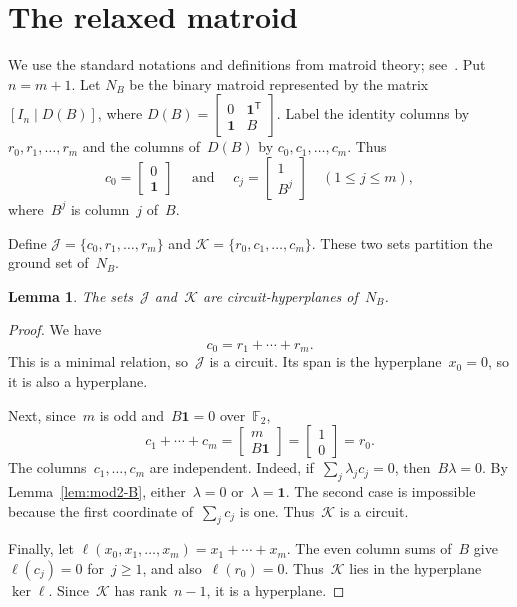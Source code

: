 \documentclass{amsart}
\newtheorem{lemma}[theorem]{Lemma}
\numberwithin{equation}{section}
\newcommand{\F}{\mathbb F}
\newcommand{\one}{\mathbf 1}
\newcommand{\cJ}{\mathcal J}
\newcommand{\cK}{\mathcal K}
\newcommand{\sfT}{\mathsf T}
\newcommand{\wideand}{ \quad \text{ and } \quad }
\begin{document}
\section{The relaxed matroid} \label{sec:not-binary-ternary}

We use the standard notations and definitions from matroid theory; see~\cite{Oxley2011book}.
Put $n=m+1$.
Let $N_B$ be the binary matroid represented by the matrix $[I_n\mid D(B)]$, where $D(B)=\begin{bmatrix} 0 & \one^{\sfT} \\ \one & B\end{bmatrix}$.
Label the identity columns by $r_0,r_1,\ldots,r_m$ and the columns of~$D(B)$ by $c_0,c_1,\ldots,c_m$.
Thus
$$
    c_0=\begin{bmatrix}0\\ \one\end{bmatrix} \wideand c_j=\begin{bmatrix}1\\ B^j\end{bmatrix} \quad(1\leq j\leq m),
$$
where~$B^j$ is column~$j$ of~$B$.

Define $\cJ=\{c_0,r_1,\ldots,r_m\}$ and $\cK=\{r_0,c_1,\ldots,c_m\}$.
These two sets partition the ground set of~$N_B$.

\begin{lemma}\label{lem:two-CH}
    The sets~$\cJ$ and~$\cK$ are circuit-hyperplanes of~$N_B$.
\end{lemma}
\begin{proof}
    We have
    $$
    c_0=r_1+\cdots+r_m.
    $$
    This is a minimal relation, so~$\cJ$ is a circuit.
    Its span is the hyperplane~$x_0=0$, so it is also a hyperplane.
    
    Next, since~$m$ is odd and~$B\one=0$ over~$\F_2$,
    $$
        c_1+\cdots+c_m = \begin{bmatrix} m\\ B\one \end{bmatrix} = \begin{bmatrix} 1\\ 0 \end{bmatrix} =r_0.
    $$
    The columns~$c_1,\ldots,c_m$ are independent.
    Indeed, if~$\sum_j\lambda_jc_j=0$, then~$B\lambda=0$.
    By Lemma~\ref{lem:mod2-B}, either~$\lambda=0$ or~$\lambda=\one$.
    The second case is impossible because the first coordinate of~$\sum_jc_j$ is one.
    Thus~$\cK$ is a circuit.
    
    Finally, let $\ell(x_0,x_1,\ldots,x_m)=x_1+\cdots+x_m$.
    The even column sums of~$B$ give~$\ell(c_j)=0$ for~$j\geq1$, and also~$\ell(r_0)=0$.
    Thus~$\cK$ lies in the hyperplane~$\ker\ell$.
    Since~$\cK$ has rank~$n-1$, it is a hyperplane.
\end{proof}
\end{document}
